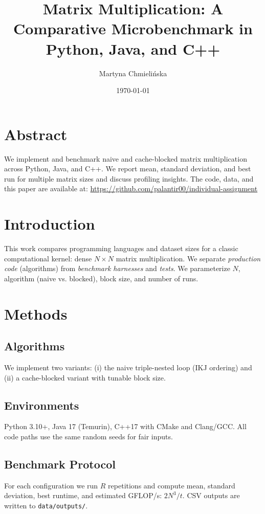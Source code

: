 \documentclass[11pt]{article}
\title{Matrix Multiplication: A Comparative Microbenchmark in Python, Java, and C++}
\author{Martyna Chmielińska}
\date{\today}
\begin{document}
\maketitle

\section*{Abstract}
We implement and benchmark naive and cache-blocked matrix multiplication across Python, Java, and C++. We report mean, standard deviation, and best run for multiple matrix sizes and discuss profiling insights. The code, data, and this paper are available at: 
\href{https://github.com/palantir00/individual-assignment}{https://github.com/palantir00/individual-assignment}


\section{Introduction}
This work compares programming languages and dataset sizes for a classic computational kernel: dense $N \times N$ matrix multiplication. We separate \emph{production code} (algorithms) from \emph{benchmark harnesses} and \emph{tests}. We parameterize $N$, algorithm (naive vs. blocked), block size, and number of runs.

\section{Methods}
\subsection{Algorithms}
We implement two variants: (i) the naive triple-nested loop (IKJ ordering) and (ii) a cache-blocked variant with tunable block size.

\subsection{Environments}
Python 3.10+, Java 17 (Temurin), C++17 with CMake and Clang/GCC. All code paths use the same random seeds for fair inputs.

\subsection{Benchmark Protocol}
For each configuration we run $R$ repetitions and compute mean, standard deviation, best runtime, and estimated GFLOP/s: $2N^3 / t$. CSV outputs are written to \texttt{data/outputs/}.
\end{document}
